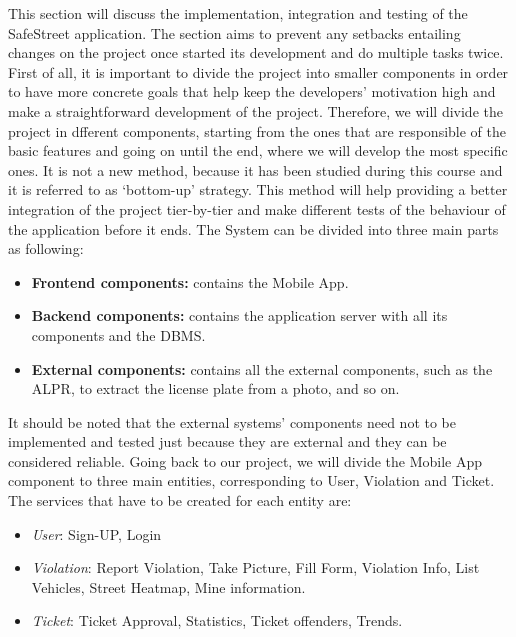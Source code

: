 This section will discuss the implementation, integration and testing of the SafeStreet application. The section aims to prevent any setbacks entailing changes on the project once started its development and do multiple tasks twice. First of all, it is important to divide the project into smaller components in order to have more concrete goals that help keep the developers’ motivation high and make a straightforward development of the project. Therefore, we will divide the project in dfferent components, starting from the ones that are responsible of the basic features and going on until the end, where we will develop the most speciﬁc ones. It is not a new method, because it has been studied during this course and it is referred to as ‘bottom-up’ strategy. This method will help providing a better integration of the project tier-by-tier and make different tests of the behaviour of the application before it ends. The System can be divided into three main parts as following:
\begin{itemize}
    \item \textbf{Frontend components:} contains the Mobile App.
    \item \textbf{Backend components:} contains the application server with all its components and the DBMS.
    \item \textbf{External components:} contains all the external components, such as the ALPR, to extract the license plate from a photo, and so on.
\end{itemize}
 It should be noted that the external systems’ components need not to be implemented and tested just because they are external and they can be considered reliable.
Going back to our project, we will divide the Mobile App component to three main entities, corresponding to User, Violation and Ticket.
The services that have to be created for each entity are:
\begin{itemize}
\item{} \textit{User}: Sign-UP, Login
\item{} \textit{Violation}: Report Violation, Take Picture, Fill Form, Violation Info, List Vehicles, Street Heatmap, Mine information.
\item{} \textit{Ticket}: Ticket Approval, Statistics, Ticket offenders, Trends.
\end{itemize}

